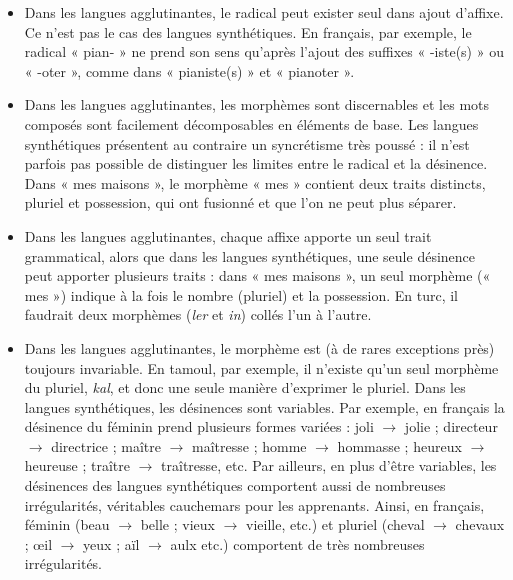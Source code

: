 \begin{itemize}
\item Dans les langues agglutinantes, le radical peut exister seul dans ajout d’affixe. Ce n’est pas le cas des langues synthétiques. En français, par exemple, le radical « pian- » ne prend son
sens qu’après l’ajout des suffixes « -iste(s) » ou « -oter », comme dans « pianiste(s) » et « pianoter ».
\item Dans les langues agglutinantes, les morphèmes sont discernables et les mots composés sont facilement décomposables en éléments de base. Les langues synthétiques présentent au contraire un syncrétisme très poussé : il n’est parfois pas possible de distinguer les limites entre le radical et la désinence. Dans « mes maisons », le morphème « mes » contient deux traits distincts, pluriel et possession, qui ont fusionné et que l’on ne peut plus séparer.
\item Dans les langues agglutinantes, chaque affixe apporte un seul trait grammatical, alors que dans les langues synthétiques, une seule désinence peut apporter plusieurs traits : dans « mes maisons », un seul morphème (« mes ») indique à la fois le nombre (pluriel) et la possession. En turc, il faudrait deux morphèmes (\textit{ler} et \textit{in}) collés l’un à l’autre.
\item Dans les langues agglutinantes, le morphème est (à de rares exceptions près) toujours invariable. En tamoul, par exemple, il n’existe qu’un seul morphème du pluriel, \textit{kal}, et donc une seule manière d’exprimer le pluriel. Dans les langues synthétiques, les désinences sont variables. Par exemple, en français la désinence du féminin prend plusieurs formes variées : joli $\rightarrow$ jolie ; directeur $\rightarrow$ directrice ; maître $\rightarrow$ maîtresse ; homme $\rightarrow$ hommasse ; heureux $\rightarrow$ heureuse ; traître $\rightarrow$ traîtresse, etc. Par ailleurs, en plus d’être variables, les désinences des langues synthétiques comportent aussi de nombreuses irrégularités, véritables cauchemars pour les apprenants. Ainsi, en français, féminin (beau $\rightarrow$ belle ; vieux $\rightarrow$ vieille, etc.) et pluriel (cheval $\rightarrow$ chevaux ; œil $\rightarrow$ yeux ; aïl $\rightarrow$ aulx etc.) comportent de très nombreuses irrégularités.

\end{itemize}
